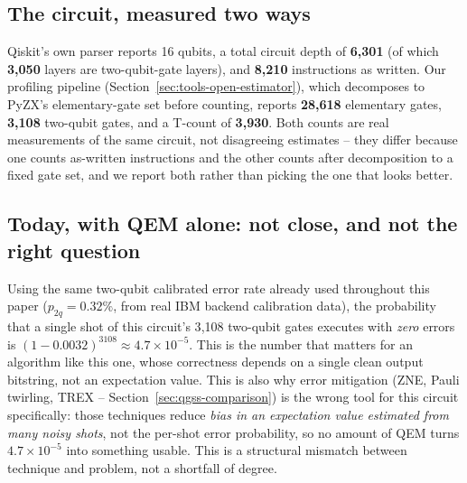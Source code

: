 \documentclass[9pt,twocolumn]{extarticle}
\begin{document}
\subsection{The circuit, measured two ways}
Qiskit's own parser reports 16 qubits, a total circuit depth of
\textbf{6{,}301} (of which \textbf{3{,}050} layers are two-qubit-gate
layers), and \textbf{8{,}210} instructions as written. Our profiling
pipeline (Section~\ref{sec:tools-open-estimator}), which decomposes to
PyZX's elementary-gate set before counting, reports \textbf{28{,}618}
elementary gates, \textbf{3{,}108} two-qubit gates, and a T-count of
\textbf{3{,}930}. Both counts are real measurements of the same circuit,
not disagreeing estimates -- they differ because one counts as-written
instructions and the other counts after decomposition to a fixed gate
set, and we report both rather than picking the one that looks better.

\subsection{Today, with QEM alone: not close, and not the right question}
Using the same two-qubit calibrated error rate already used throughout this
paper ($p_{2q}=0.32\%$, from real IBM backend calibration data), the
probability that a single shot of this circuit's 3{,}108 two-qubit gates
executes with \emph{zero} errors is
$(1-0.0032)^{3108} \approx 4.7\times10^{-5}$. This is the number that
matters for an algorithm like this one, whose correctness depends on
a single clean output bitstring, not an expectation value. This is also
why error mitigation (ZNE, Pauli twirling, TREX -- Section~\ref{sec:qgss-comparison})
is the wrong tool for this circuit specifically: those techniques reduce
\emph{bias in an expectation value estimated from many noisy shots}, not
the per-shot error probability, so no amount of QEM turns
$4.7\times10^{-5}$ into something usable. This is a structural
mismatch between technique and problem, not a shortfall of degree.
\end{document}
